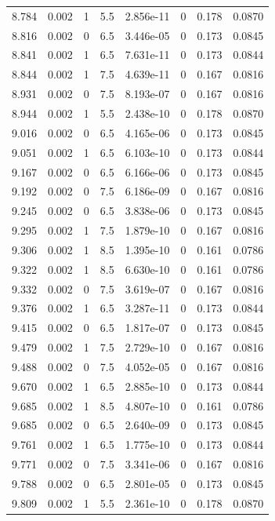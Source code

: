 \documentclass[preview]{standalone}
\begin{document}
{{{{{{\begin{tabular}{L{1.2cm}C{1.2cm} C{0.3cm}C{0.5cm} C{1.4cm}C{1.4cm} C{1.4cm}C{1.4cm}}
  8.784  &  0.002  & 1     & 5.5 &  2.856e-11  & 0  & 0.178 &  0.0870   \\ 
  8.816  &  0.002  & 0     & 6.5 &  3.446e-05  & 0  & 0.173 &  0.0845   \\ 
  8.841  &  0.002  & 1     & 6.5 &  7.631e-11  & 0  & 0.173 &  0.0844   \\ 
  8.844  &  0.002  & 1     & 7.5 &  4.639e-11  & 0  & 0.167 &  0.0816   \\ 
  8.931  &  0.002  & 0     & 7.5 &  8.193e-07  & 0  & 0.167 &  0.0816   \\ 
  8.944  &  0.002  & 1     & 5.5 &  2.438e-10  & 0  & 0.178 &  0.0870   \\ 
  9.016  &  0.002  & 0     & 6.5 &  4.165e-06  & 0  & 0.173 &  0.0845   \\ 
  9.051  &  0.002  & 1     & 6.5 &  6.103e-10  & 0  & 0.173 &  0.0844   \\ 
  9.167  &  0.002  & 0     & 6.5 &  6.166e-06  & 0  & 0.173 &  0.0845   \\ 
  9.192  &  0.002  & 0     & 7.5 &  6.186e-09  & 0  & 0.167 &  0.0816   \\ 
  9.245  &  0.002  & 0     & 6.5 &  3.838e-06  & 0  & 0.173 &  0.0845   \\ 
  9.295  &  0.002  & 1     & 7.5 &  1.879e-10  & 0  & 0.167 &  0.0816   \\ 
  9.306  &  0.002  & 1     & 8.5 &  1.395e-10  & 0  & 0.161 &  0.0786   \\ 
  9.322  &  0.002  & 1     & 8.5 &  6.630e-10  & 0  & 0.161 &  0.0786   \\ 
  9.332  &  0.002  & 0     & 7.5 &  3.619e-07  & 0  & 0.167 &  0.0816   \\ 
  9.376  &  0.002  & 1     & 6.5 &  3.287e-11  & 0  & 0.173 &  0.0844   \\ 
  9.415  &  0.002  & 0     & 6.5 &  1.817e-07  & 0  & 0.173 &  0.0845   \\ 
  9.479  &  0.002  & 1     & 7.5 &  2.729e-10  & 0  & 0.167 &  0.0816   \\ 
  9.488  &  0.002  & 0     & 7.5 &  4.052e-05  & 0  & 0.167 &  0.0816   \\ 
  9.670  &  0.002  & 1     & 6.5 &  2.885e-10  & 0  & 0.173 &  0.0844   \\ 
  9.685  &  0.002  & 1     & 8.5 &  4.807e-10  & 0  & 0.161 &  0.0786   \\ 
  9.685  &  0.002  & 0     & 6.5 &  2.640e-09  & 0  & 0.173 &  0.0845   \\ 
  9.761  &  0.002  & 1     & 6.5 &  1.775e-10  & 0  & 0.173 &  0.0844   \\ 
  9.771  &  0.002  & 0     & 7.5 &  3.341e-06  & 0  & 0.167 &  0.0816   \\ 
  9.788  &  0.002  & 0     & 6.5 &  2.801e-05  & 0  & 0.173 &  0.0845   \\ 
  9.809  &  0.002  & 1     & 5.5 &  2.361e-10  & 0  & 0.178 &  0.0870   \\ 
\hline 
\end{tabular} 

}}}}}}
\end{document}
